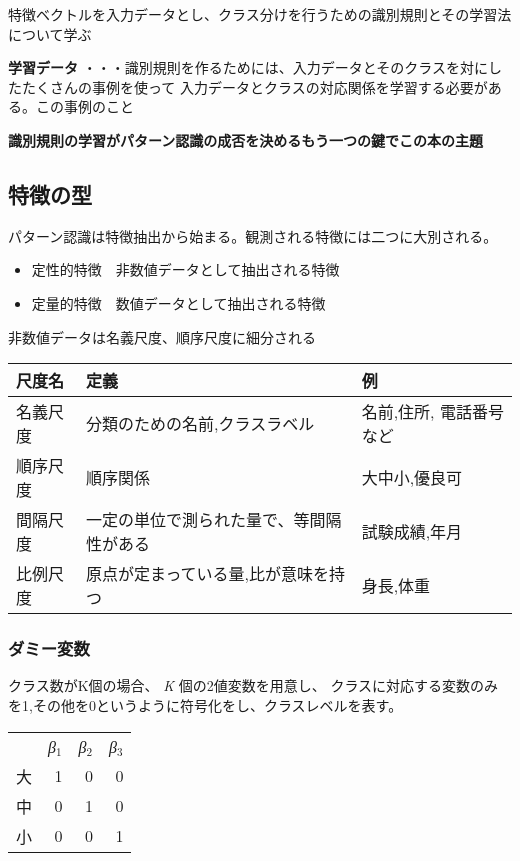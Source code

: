 \documentclass[11pt]{article}
\begin{document}
特徴ベクトルを入力データとし、クラス分けを行うための識別規則とその学習法について学ぶ

\textbf{学習データ} ・・・識別規則を作るためには、入力データとそのクラスを対にしたたくさんの事例を使って
入力データとクラスの対応関係を学習する必要がある。この事例のこと

\textbf{\textbf{識別規則の学習がパターン認識の成否を決めるもう一つの鍵でこの本の主題}}


\subsection{特徴の型}
\label{sec:orgheadline3}
パターン認識は特徴抽出から始まる。観測される特徴には二つに大別される。
\begin{itemize}
\item 定性的特徴　非数値データとして抽出される特徴
\item 定量的特徴　数値データとして抽出される特徴
\end{itemize}

非数値データは名義尺度、順序尺度に細分される

\begin{center}
\begin{tabular}{lll}
\hline
尺度名 & 定義 & 例\\
\hline
名義尺度 & 分類のための名前,クラスラベル & 名前,住所, 電話番号など\\
順序尺度 & 順序関係 & 大中小,優良可\\
間隔尺度 & 一定の単位で測られた量で、等間隔性がある & 試験成績,年月\\
比例尺度 & 原点が定まっている量,比が意味を持つ & 身長,体重\\
\hline
\end{tabular}
\end{center}

\subsubsection{ダミー変数}
\label{sec:orgheadline2}
クラス数がK個の場合、 \emph{K} 個の2値変数を用意し、
クラスに対応する変数のみを1,その他を0というように符号化をし、クラスレベルを表す。


\begin{center}
\begin{tabular}{lrrr}
\hline
 & \emph{β\(_{\text{1}}\)} & \emph{β\(_{\text{2}}\)} & \emph{β\(_{\text{3}}\)}\\
大 & 1 & 0 & 0\\
中 & 0 & 1 & 0\\
小 & 0 & 0 & 1\\
\hline
\end{tabular}
\end{center}
\end{document}
